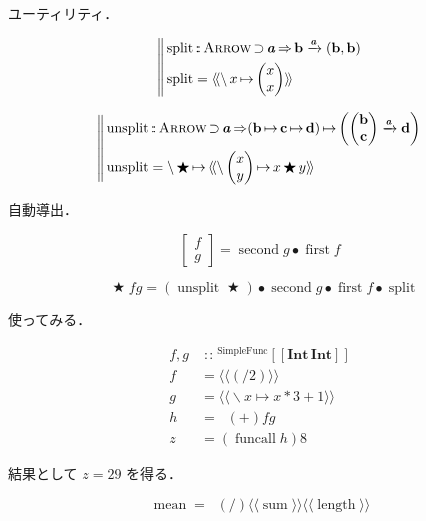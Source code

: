 \documentclass[a5paper,twoside,fleqn,draft]{jsbook}
\def\[{[\![}
\def\]{]\!]}
\newcommand{\Langle}{\langle\!\langle}
\newcommand{\Rangle}{\rangle\!\rangle}
\newcommand{\mBrace}{\Vert}
\DeclareMathOperator{\mSuperClass}{\Rightarrow}
\DeclareMathOperator{\mSuperSet}{\supset}
\newcommand{\mSpecialFunc}[1]{#1}
\DeclareMathOperator{\mFirst}{\mSpecialFunc{first}}
\DeclareMathOperator{\mFuncall}{\mSpecialFunc{funcall}}
\DeclareMathOperator{\mLength}{\mSpecialFunc{length}}
\DeclareMathOperator{\mLiftATwo}{\mSpecialFunc{liftA}_2}
\DeclareMathOperator{\mMean}{\mSpecialFunc{mean}}
\DeclareMathOperator{\mSecond}{\mSpecialFunc{second}}
\DeclareMathOperator{\mSplit}{\mSpecialFunc{split}}
\DeclareMathOperator{\mSum}{\mSpecialFunc{sum}}
\DeclareMathOperator{\mUnsplit}{\mSpecialFunc{unsplit}}
\newcommand{\mArrowArrow}[1]{\xrightarrow{#1}}
\DeclareMathOperator{\mBinOp}{\bigstar}
\DeclareMathOperator{\mCompCat}{\bullet}
\DeclareMathOperator{\mFuncArrow}{\mapsto}
\DeclareMathOperator{\mIn}{{:\!:}}
\DeclareMathOperator{\mLambda}{\backslash}
\DeclareMathOperator{\mLambdaArrow}{\mapsto}
\newcommand{\mType}[1]{\mathbf{#1}} %
\newcommand{\mPolymorphicTypeParameter}[1]{\textbf{\textit{#1}}}
\newcommand{\mB}{\mType{b}}
\newcommand{\mC}{\mType{c}}
\newcommand{\mD}{\mType{d}}
\newcommand{\mIntType}{\mType{Int}}
\newcommand{\mValueConstructor}[1]{\mathrm{#1}}
\newcommand{\mValueWith}[2]{{}^\mValueConstructor{#1}\[#2\]}
\newcommand{\mArrowWith}[1]{\Langle#1\Rangle}
\newcommand{\mPairWith}[2]{\begin{pmatrix}#1\\#2\end{pmatrix}}
\newcommand{\mTypeClass}[1]{\textsc{#1}} %
\newcommand{\mArrowTypeClass}{\mTypeClass{Arrow}}
\begin{document}
ユーティリティ．

\begin{equation}
  \left\mBrace
  \begin{aligned}
    &\mSplit\mIn\mArrowTypeClass\mSuperSet\mPolymorphicTypeParameter{a}
    \mSuperClass\mB\mArrowArrow{\mPolymorphicTypeParameter{a}}(\mB,\mB)\\
    &\mSplit=\mArrowWith{\mLambda x\mLambdaArrow\mPairWith{x}{x}}
  \end{aligned}
  \right.
\end{equation}

\begin{equation}
  \left\mBrace
  \begin{aligned}
    &\mUnsplit\mIn\mArrowTypeClass\mSuperSet\mPolymorphicTypeParameter{a}
    \mSuperClass(\mB\mFuncArrow\mC\mFuncArrow\mD)
    \mFuncArrow\left(\mPairWith{\mB}{\mC}\mArrowArrow{\mPolymorphicTypeParameter{a}}\mD\right)\\
    &\mUnsplit
    =\mLambda\mBinOp\mLambdaArrow{}\mArrowWith{\mLambda\mPairWith{x}{y}\mFuncArrow x\mBinOp y}
  \end{aligned}
  \right.
\end{equation}

自動導出．

\begin{equation}
  \begin{bmatrix}
    f\\
    g
  \end{bmatrix}
  =\mSecond g\mCompCat\mFirst f
\end{equation}

\begin{equation}
  \mLiftATwo\mBinOp fg
  =(\mUnsplit\mBinOp)\mCompCat\mSecond g\mCompCat\mFirst f\mCompCat\mSplit
\end{equation}

使ってみる．

\begin{align}
  f,g&\mIn\mValueWith{SimpleFunc}{\mIntType\,\mIntType}\\
  f&=\mArrowWith{(/2)}\\
  g&=\mArrowWith{\mLambda x\mLambdaArrow x*3+1}\\
  h&=\mLiftATwo(+)fg\\
  z&=(\mFuncall h)8
\end{align}

結果として $z=29$ を得る．

\begin{equation}
  \mMean
  =\mLiftATwo(/)\mArrowWith{\mSum}\mArrowWith{\mLength}
\end{equation}
\end{document}
